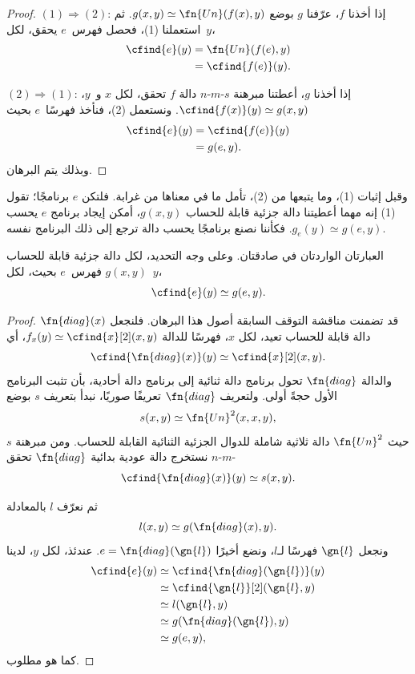 \documentclass[../../../include/open-logic-section]{subfiles}
\begin{document}
\begin{proof}
$(1) \Rightarrow (2)$: إذا أخذنا $f$، عرّفنا $g$ بوضع
$g(x,y) \simeq \fn{Un}(f(x),y)$. ثم استعملنا (1)، فحصل فهرس~$e$
يحقق، لكل~$y$،
\begin{align*}
\cfind{e}(y) & = \fn{Un}(f(e),y) \\
& = \cfind{f(e)}(y).
\end{align*}

$(2) \Rightarrow (1)$: إذا أخذنا $g$، أعطتنا مبرهنة $s$-$m$-$n$
دالة $f$ تحقق، لكل $x$ و~$y$،
$\cfind{f(x)}(y) \simeq g(x,y)$. ونستعمل (2)، فنأخذ فهرسًا~$e$
بحيث
\begin{align*}
\cfind{e}(y) & = \cfind{f(e)}(y) \\
& = g(e,y).
\end{align*}
وبذلك يتم البرهان.
\end{proof}

\begin{explain}
وقبل إثبات (1)، وما يتبعها من (2)، تأمل ما في معناها من غرابة.
فلتكن $e$ برنامجًا؛ تقول (1) إنه مهما أعطيتنا
دالة جزئية قابلة للحساب $g(x,y)$، أمكن إيجاد برنامج $e$
يحسب $g_e(y) \simeq g(e,y)$. فكأننا نصنع برنامجًا يحسب
دالة ترجع إلى ذلك البرنامج نفسه.
\end{explain}

\begin{thm}
العبارتان الواردتان في  صادقتان. وعلى وجه
التحديد، لكل دالة جزئية قابلة للحساب $g(x,y)$ فهرس~$e$ بحيث،
لكل~$y$،
\[
\cfind{e}(y) \simeq g(e,y).
\]
\end{thm}

\begin{proof}
قد تضمنت مناقشة التوقف السابقة أصول هذا البرهان. فلنجعل
$\fn{diag}(x)$ دالة قابلة للحساب تعيد، لكل $x$، فهرسًا للدالة
$f_x(y) \simeq \cfind{x}[2](x,y)$، أي
\[
\cfind{\fn{diag}(x)}(y) \simeq \cfind{x}[2](x,y).
\]
والدالة $\fn{diag}$ تحول برنامج دالة ثنائية إلى برنامج
دالة أحادية، بأن تثبت البرنامج الأول حجةً أولى. ولتعريف
$\fn{diag}$ تعريفًا صوريًا، نبدأ بتعريف $s$ بوضع
\[
s(x,y) \simeq \fn{Un}^2(x,x,y),
\]
حيث $\fn{Un}^2$ دالة ثلاثية شاملة للدوال الجزئية الثنائية القابلة
للحساب. ومن مبرهنة $s$-$m$-$n$ نستخرج دالة عودية بدائية
$\fn{diag}$ تحقق
\[
\cfind{\fn{diag}(x)}(y) \simeq s(x,y).
\]

ثم نعرّف $l$ بالمعادلة
\[
l(x,y) \simeq g(\fn{diag}(x),y).
\]
ونجعل $\gn{l}$ فهرسًا لـ$l$، ونضع أخيرًا
$e=\fn{diag}(\gn{l})$. عندئذ، لكل $y$، لدينا
\begin{align*}
\cfind{e}(y) & \simeq \cfind{\fn{diag}(\gn{l})}(y) \\
& \simeq \cfind{\gn{l}}[2](\gn{l}, y) \\
& \simeq l(\gn{l}, y) \\
& \simeq g(\fn{diag}(\gn{l}),y) \\
& \simeq g(e, y),
\end{align*}
كما هو مطلوب.
\end{proof}
\end{document}

